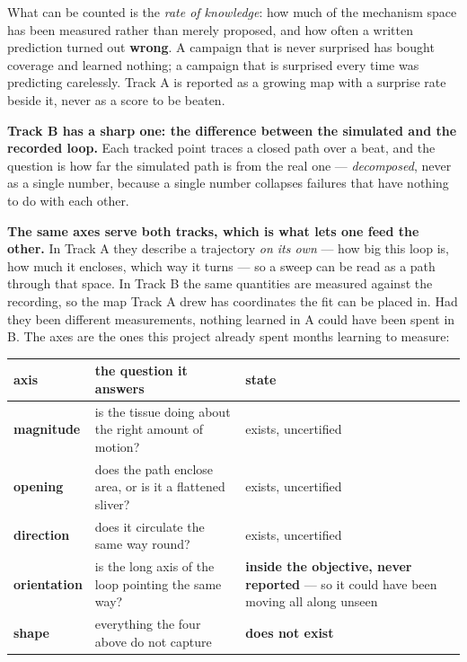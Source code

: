 \documentclass[11pt,a4paper]{article}
\begin{document}
What can be counted is the \emph{rate of knowledge}: how much of the mechanism space has been
measured rather than merely proposed, and how often a written prediction turned out \textbf{wrong}.
A campaign that is never surprised has bought coverage and learned nothing; a campaign that is
surprised every time was predicting carelessly. Track A is reported as a growing map with a
surprise rate beside it, never as a score to be beaten.

\textbf{Track B has a sharp one: the difference between the simulated and the recorded loop.} Each
tracked point traces a closed path over a beat, and the question is how far the simulated path is
from the real one --- \emph{decomposed}, never as a single number, because a single number
collapses failures that have nothing to do with each other.

\textbf{The same axes serve both tracks, which is what lets one feed the other.} In Track A they
describe a trajectory \emph{on its own} --- how big this loop is, how much it encloses, which way it
turns --- so a sweep can be read as a path through that space. In Track B the same quantities are
measured against the recording, so the map Track A drew has coordinates the fit can be placed in.
Had they been different measurements, nothing learned in A could have been spent in B. The axes are
the ones this project already spent months learning to measure:

\begin{center}\small
\begin{tabular}{@{}l p{6.9cm} l@{}}
\toprule
\textbf{axis} & \textbf{the question it answers} & \textbf{state}\\
\midrule
\textbf{magnitude} & is the tissue doing about the right amount of motion? & exists, uncertified\\
\textbf{opening} & does the path enclose area, or is it a flattened sliver? & exists, uncertified\\
\textbf{direction} & does it circulate the same way round? & exists, uncertified\\
\textbf{orientation} & is the long axis of the loop pointing the same way? & \textbf{inside the
objective, never reported} --- so it could have been moving all along unseen\\
\textbf{shape} & everything the four above do not capture & \textbf{does not exist}\\
\bottomrule
\end{tabular}
\end{center}
\end{document}
